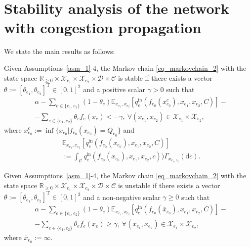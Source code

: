 \section{Stability analysis of the network with congestion propagation}
\label{sec_example}

We state the main results as follows:
\begin{thm}
\label{thm_2}
Given Assumptions~\ref{asm_1}-4, the Markov chain \eqref{eq_markovchain_2} with the state space $\mathbb{R}_{\geq0}\times\mathcal{X}_{e_1}\times\mathcal{X}_{e_2}\times\mathcal{D}\times\mathcal{C}$ is stable if there exists a vector $\theta:=[\theta_{e_1},\theta_{e_2}]^{\mathrm{T}}\in[0, 1]^2$ and a positive scalar $\gamma>0$ such that
\begin{align}
    &\alpha- \sum_{e\in\{e_1,e_2\}} (1-\theta_{e})\mathbb{E}_{x_{e_1},x_{e_2}}[q_{e}^{\mathrm{in}}(f_{e_0}(x_{e_0}^c), x_{e_1},x_{e_2}, C)]- \nonumber \\
    & - \sum_{e\in\{e_1,e_2\}}\theta_{e} f_{e}(x_{e}) < -\gamma, ~\forall (x_{e_1},x_{e_2})\in\mathcal{X}_{e_1}\times\mathcal{X}_{e_2}, 
    \label{eq_thm2_1}
\end{align}
where $x_{e_0}^c:=\inf\{x_{e_0}|f_{e_0}(x_{e_0})=Q_{e_0}\}$ and
\begin{align}
    &\mathbb{E}_{x_{e_1},x_{e_2}}[q_{e}^{\mathrm{in}}(f_{e_0}(x_{e_0}), x_{e_1},x_{e_2}, C)] \nonumber \\
    &:= \int_{\mathcal{C}} q_{e}^{\mathrm{in}}(f_{e_0}(x_{e_0}), x_{e_1}, x_{e_2}, c)) \Gamma_{x_{e_1,e_2}}(\mathrm{d}c).
\end{align}
\end{thm}

\begin{thm}
\label{thm_3}
Given Assumptions~\ref{asm_1}-4, the Markov chain \eqref{eq_markovchain_2} with the state space $\mathbb{R}_{\geq0}\times\mathcal{X}_{e_1}\times\mathcal{X}_{e_2}\times\mathcal{D}\times\mathcal{C}$ is unstable if there exists a vector $\theta:=[\theta_{e_1},\theta_{e_2}]^{\mathrm{T}}\in[0,1]^2$ and a non-negative scalar $\gamma\geq0$ such that
\begin{align}
    &\alpha- \sum_{e\in\{e_1,e_2\}} (1-\theta_{e})\mathbb{E}_{x_{e_1},x_{e_2}}[q_{e}^{\mathrm{in}}(f_{e_0}(\bar{x}_{e_0}), x_{e_1},x_{e_2}, C)]- \nonumber \\
    & - \sum_{e\in\{e_1,e_2\}}\theta_{e} f_{e}(x_{e}) \geq \gamma, ~\forall (x_{e_1},x_{e_2})\in\mathcal{X}_{e_1}\times\mathcal{X}_{e_2}, \label{eq_thm3_1}
\end{align}
where $\bar{x}_{e_0}:=\infty$.
\end{thm}

